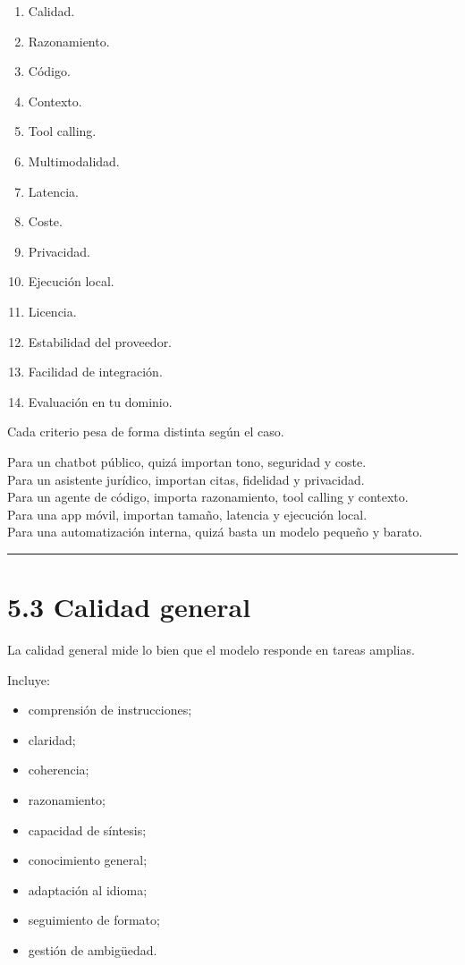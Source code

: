 \begin{enumerate}
\def\labelenumi{\arabic{enumi}.}
\tightlist
\item
  Calidad.
\item
  Razonamiento.
\item
  Código.
\item
  Contexto.
\item
  Tool calling.
\item
  Multimodalidad.
\item
  Latencia.
\item
  Coste.
\item
  Privacidad.
\item
  Ejecución local.
\item
  Licencia.
\item
  Estabilidad del proveedor.
\item
  Facilidad de integración.
\item
  Evaluación en tu dominio.
\end{enumerate}

Cada criterio pesa de forma distinta según el caso.

Para un chatbot público, quizá importan tono, seguridad y coste.\\
Para un asistente jurídico, importan citas, fidelidad y privacidad.\\
Para un agente de código, importa razonamiento, tool calling y
contexto.\\
Para una app móvil, importan tamaño, latencia y ejecución local.\\
Para una automatización interna, quizá basta un modelo pequeño y barato.

\begin{center}\rule{0.5\linewidth}{0.5pt}\end{center}

\section{5.3 Calidad general}\label{calidad-general}

La calidad general mide lo bien que el modelo responde en tareas
amplias.

Incluye:

\begin{itemize}
\tightlist
\item
  comprensión de instrucciones;
\item
  claridad;
\item
  coherencia;
\item
  razonamiento;
\item
  capacidad de síntesis;
\item
  conocimiento general;
\item
  adaptación al idioma;
\item
  seguimiento de formato;
\item
  gestión de ambigüedad.
\end{itemize}

